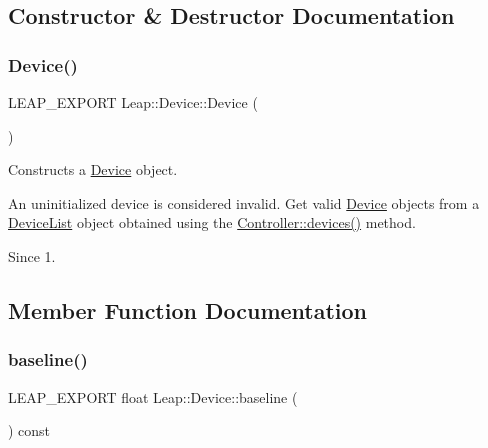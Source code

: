 \subsection{Constructor \& Destructor Documentation}
\mbox{\label{class_leap_1_1_device_ab14c21cd02a6773fa699980cb58032e2}} 
\subsubsection{\texorpdfstring{Device()}{Device()}}
{\footnotesize\ttfamily L\+E\+A\+P\+\_\+\+E\+X\+P\+O\+RT Leap\+::\+Device\+::\+Device (\begin{DoxyParamCaption}{ }\end{DoxyParamCaption})}

Constructs a \hyperlink{class_leap_1_1_device}{Device} object.

An uninitialized device is considered invalid. Get valid \hyperlink{class_leap_1_1_device}{Device} objects from a \hyperlink{class_leap_1_1_device_list}{Device\+List} object obtained using the \hyperlink{class_leap_1_1_controller_ad3b6ea558fb39cb32c20c3fd44dc5da1}{Controller\+::devices()} method.


\begin{DoxyCodeInclude}
\end{DoxyCodeInclude}


\begin{DoxySince}{Since}
1. 
\end{DoxySince}


\subsection{Member Function Documentation}
\mbox{\label{class_leap_1_1_device_a53a212f30052d9e0c4d7ae028a85a620}} 
\subsubsection{\texorpdfstring{baseline()}{baseline()}}
{\footnotesize\ttfamily L\+E\+A\+P\+\_\+\+E\+X\+P\+O\+RT float Leap\+::\+Device\+::baseline (\begin{DoxyParamCaption}{ }\end{DoxyParamCaption}) const}

